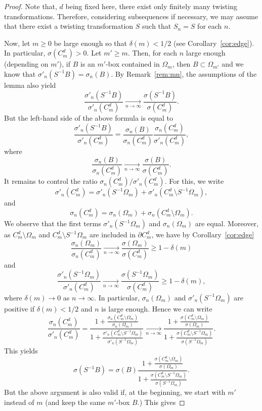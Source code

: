 \documentclass[10pt]{amsart}
\theoremstyle{definition}\newtheorem{defi}[theo]{Definition}\newtheorem{rema}[theo]{Remark}\newtheorem{exam}[theo]{Example}\newtheorem{exem}[theo]{Example}\newtheorem{nota}[theo]{Notation}
\newcommand{\tend}[3][]{\xrightarrow[#2\to#3]{#1}}
\newcommand{\cd}{C^{d}}
\newcommand{\ovC}{\Omega}
\begin{document}
\begin{proof}
Note that, $d$ being fixed here, there exist only finitely many twisting transformations. Therefore, considering subsequences if necessary, we may assume that there exist a twisting transformation $S$ such that $S_n=S$ for each $n$.

Now, let $m\ge0$ be large enough so that $\delta(m)<1/2$ (see Corollary~\ref{cor:edge}). In particular, $\sigma(\cd_m)>0$. Let $m'\ge m$. Then, for each $n$ large enough (depending on $m'$), if $B$ is an $m'$-box contained in $\ovC_m$, then $B\subset\ovC_{m'}$ and we know that $\sigma'_n(S^{-1}B)=\sigma_n(B)$. By Remark~\ref{rem:mn}, the assumptions of the lemma also yield
\[
\dfrac{\sigma'_n(S^{-1}B)}{\sigma'_n(\cd_m)}\tend{n}{\infty} \dfrac{\sigma(S^{-1}B)}{\sigma(\cd_m)}.
\]
But the left-hand side of the above formula is equal to
\[
\dfrac{\sigma'_n(S^{-1}B)}{\sigma'_n(\cd_m)}=\dfrac{\sigma_n(B)}{\sigma_n(\cd_m)} \dfrac{\sigma_n(\cd_m)}{\sigma'_n(\cd_m)},
\]
where
\[
\dfrac{\sigma_n(B)}{\sigma_n(\cd_m)}\tend{n}{\infty} \dfrac{\sigma(B)}{\sigma(\cd_m)}.
\]
It remains to control the ratio $\sigma_n(\cd_m)/{\sigma'_n(\cd_m)}$. For this, we write
\[
\sigma'_n(\cd_m)=\sigma'_n(S^{-1}\ovC_m)+\sigma'_n(\cd_m\setminus S^{-1}\ovC_m),
\]
and
\[
\sigma_n(\cd_m)=\sigma_n(\ovC_m)+\sigma_n(\cd_m\setminus \ovC_m).
\]
We observe that the first terms $\sigma'_n(S^{-1}\ovC_m)$ and $\sigma_n(\ovC_m)$ are equal. Moreover, as $\cd_m\setminus \ovC_m$ and $\cd_m\setminus S^{-1}\ovC_m$ are included in $\partial \cd_m$, we have by Corollary~\ref{cor:edge}
\[
\frac{\sigma_n(\ovC_m)}{\sigma_n(\cd_m)}\tend{n}{\infty} \frac{\sigma(\ovC_m)}{\sigma(\cd_m)} \ge 1-\delta(m)
\]
and
\[
\frac{\sigma'_n(S^{-1}\ovC_m)}{\sigma'_n(\cd_m)}\tend{n}{\infty} \frac{\sigma(S^{-1}\ovC_m)}{\sigma(\cd_m)} \ge 1-\delta(m),
\]
where $\delta(m)\to 0$ as $n\to \infty$. In particular, $\sigma_n(\ovC_m)$ and $\sigma'_n(S^{-1}\ovC_m)$ are positive if $\delta(m)<1/2$ and $n$ is large enough. Hence we can write
\[
\dfrac{\sigma_n(\cd_m)}{\sigma'_n(\cd_m)} = \dfrac{1+ \frac{\sigma_n(\cd_m\setminus \ovC_m)}{\sigma_n(\ovC_m)} }{1+ \frac{\sigma'_n(\cd_m\setminus S^{-1}\ovC_m)}{\sigma'_n(S^{-1}\ovC_m)} }
\tend{n}{\infty} \dfrac{1+ \frac{\sigma(\cd_m\setminus \ovC_m)}{\sigma(\ovC_m)} }{1+ \frac{\sigma(\cd_m\setminus S^{-1}\ovC_m)}{\sigma(S^{-1}\ovC_m)} }.
\]
This yields
\[
\sigma(S^{-1}B)={\sigma(B)}
\dfrac{1+ \frac{\sigma(\cd_m\setminus \ovC_m)}{\sigma(\ovC_m)} }{1+ \frac{\sigma(\cd_m\setminus S^{-1}\ovC_m)}{\sigma(S^{-1}\ovC_m)} }.
\]
But the above argument is also valid if, at the beginning, we start with $m'$ instead of $m$ (and keep the same $m'$-box $B$.) This gives

\end{proof}
\end{document}
